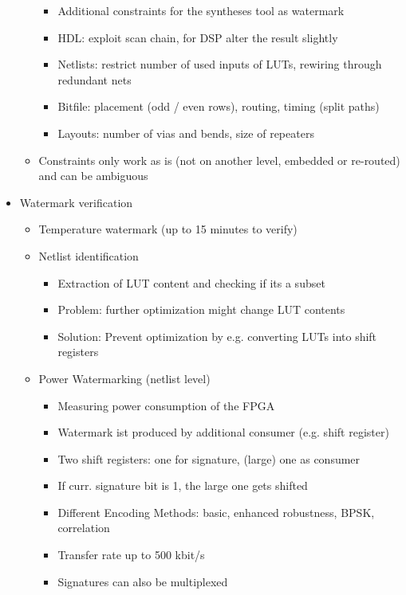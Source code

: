 \documentclass[11pt, paper=a4, twocolumn]{scrartcl}
\begin{document}
\begin{itemize}
\begin{itemize}
\begin{itemize}
							\item Additional constraints for the syntheses tool as watermark
							\item HDL: exploit scan chain, for DSP alter the result slightly
							\item Netlists: restrict number of used inputs of LUTs, rewiring through redundant nets
							\item Bitfile: placement (odd / even rows), routing, timing (split paths)
							\item Layouts: number of vias and bends, size of repeaters
						\end{itemize}
					\item Constraints only work as is (not on another level, embedded or re-routed) and can be ambiguous
				\end{itemize}
			\item Watermark verification
				\begin{itemize}
					\item Temperature watermark (up to 15 minutes to verify)
					\item Netlist identification
						\begin{itemize}
							\item Extraction of LUT content and checking if its a subset
							\item Problem: further optimization might change LUT contents
							\item Solution: Prevent optimization by e.g. converting LUTs into shift registers
						\end{itemize}
					\item Power Watermarking (netlist level)
						\begin{itemize}
							\item Measuring power consumption of the FPGA
							\item Watermark ist produced by additional consumer (e.g. shift register)
							\item Two shift registers: one for signature, (large) one as consumer
							\item If curr. signature bit is 1, the large one gets shifted
							\item Different Encoding Methods: basic, enhanced robustness, BPSK, correlation
							\item Transfer rate up to 500 kbit/s
							\item Signatures can also be multiplexed
						\end{itemize}
				\end{itemize}

		\end{itemize}
\end{document}
